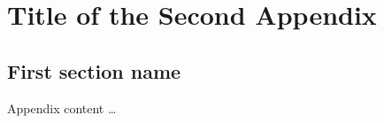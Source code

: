 \chapter{Title of the Second Appendix}\label{app:inst02}
%
\section{First section name}

Appendix content \ldots























